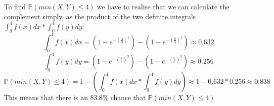 To find $\mathbb{P}(min(X, Y ) \leq 4)$ we have to realise that we can calculate the complement simply, as the product of the two definite integrals $\int_0^4f(x)dx * \int_0^4f(y)dy$:
$$
\int_0^4f(x)dx = (1 - e^{-(\frac{4}{4})^{2}}) - (1 - e^{-(\frac{0}{4})^{2}}) \approx 0.632
$$
$$
\int_0^4f(y)dy = (1 - e^{-(\frac{4}{6})^{3}}) - (1 - e^{-(\frac{0}{6})^{3}}) \approx 0.256
$$
$$
\mathbb{P}(min(X, Y ) \leq 4) = 1 - \left(\int_0^4f(x)dx *\int_0^4f(y)dy\right) \approx 1 - 0.632*0.256 \approx 0.838
$$
This means that there is an $83.8\%$ chance that $\mathbb{P}(min(X, Y ) \leq 4)$